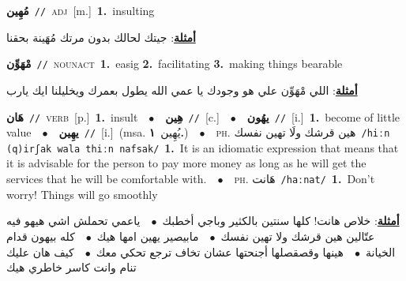 \documentclass[10pt,a4paper,twoside]{article} %
\begin{document}
\begin{multicols}{2}
{\setlength\topsep{0pt}\textbf{\foreignlanguage{arabic}{مُهِين}}\ {\color{gray}\texttt{//}\color{black}}\ \textsc{adj}\ [m.]\ \textbf{1.}~insulting\  \begin{flushright}\color{gray}\foreignlanguage{arabic}{\textbf{\underline{\foreignlanguage{arabic}{أمثلة}}}: جيتك لحالك بدون مرتك مُهَينة بحقنا}\end{flushright}\color{black}} \vspace{2mm}

{\setlength\topsep{0pt}\textbf{\foreignlanguage{arabic}{مْهَوِّن}}\ {\color{gray}\texttt{//}\color{black}}\ \textsc{noun\textunderscore act}\ \textbf{1.}~easig  \textbf{2.}~facilitating  \textbf{3.}~making things bearable\  \begin{flushright}\color{gray}\foreignlanguage{arabic}{\textbf{\underline{\foreignlanguage{arabic}{أمثلة}}}: اللي مْهَوِّن علي هو وجودك يا عمي الله يطول بعمرك ويخليلنا ايك يارب}\end{flushright}\color{black}} \vspace{2mm}

{\setlength\topsep{0pt}\textbf{\foreignlanguage{arabic}{هَان}}\ {\color{gray}\texttt{//}\color{black}}\ \textsc{verb}\ [p.]\ \textbf{1.}~insult\ \ $\bullet$\ \ \setlength\topsep{0pt}\textbf{\foreignlanguage{arabic}{هِين}}\ {\color{gray}\texttt{//}\color{black}}\ [c.]\ \ $\bullet$\ \ \setlength\topsep{0pt}\textbf{\foreignlanguage{arabic}{يهُون}}\ {\color{gray}\texttt{//}\color{black}}\ [i.]\ \textbf{1.}~become of little value\ \ $\bullet$\ \ \setlength\topsep{0pt}\textbf{\foreignlanguage{arabic}{يهِين}}\ {\color{gray}\texttt{//}\color{black}}\ [i.]\ \color{gray}(msa. \foreignlanguage{arabic}{يُهِين}~\foreignlanguage{arabic}{\textbf{١.}})\color{black}\ \ $\bullet$\ \ \textsc{ph.} \color{gray} \foreignlanguage{arabic}{هين قرشك ولَا تهين نفسك}\color{black}\ {\color{gray}\texttt{/{\sffamily hiːn (q)irʃak wala thiːn nafsak}/}\color{black}}\ \textbf{1.}~It is an idiomatic expression that means that it is advisable for the person to pay more money as long as he will get the services that he will be comfortable with.\ \ $\bullet$\ \ \textsc{ph.} \color{gray} \foreignlanguage{arabic}{هَانت}\color{black}\ {\color{gray}\texttt{/{\sffamily haːnat}/}\color{black}}\ \textbf{1.}~Don't worry! Things will go smoothly\  \begin{flushright}\color{gray}\foreignlanguage{arabic}{\textbf{\underline{\foreignlanguage{arabic}{أمثلة}}}: خلاص هانت! كلها سنتين بالكثير وباجي أخطبك\ $\bullet$\ \  ياعمي تحملش اشي هيهو فيه عتّالين هين قرشك ولا تهين نفسك\ $\bullet$\ \  مابيصير يهين امها هيك\ $\bullet$\ \  كله بيهون قدام الخيانة\ $\bullet$\ \  هينها وقصقصلها أجنحتها عشان تخاف ترجع تحكي معك\ $\bullet$\ \  كيف هان عليك تنام وانت كاسر خاطري هيك}\end{flushright}\color{black}} \vspace{2mm}


\end{multicols}
\end{document}
